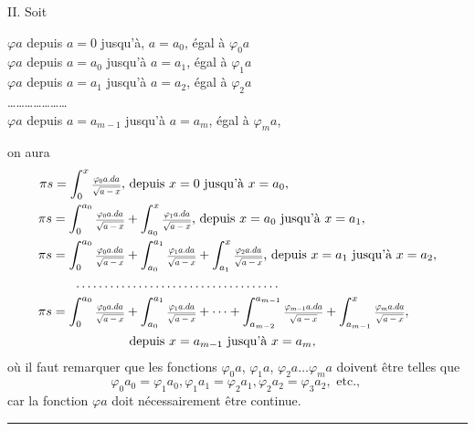 \documentclass[oneside, 12 pt, leqno]{memoir}
\let\oldfrac\frac
\def\frac#1#2{\mathchoice{\text{\scalebox{.83}{${\oldfrac{#1}{#2}}$}}}{\text{\scalebox{.83}{${\displaystyle\oldfrac{#1}{#2}}$}}}{\genfrac{}{}{}{2}{#1}{#2}}{\genfrac{}{}{}{3}{#1}{#2}}}
\begin{document}
II. Soit
\begin{center}
\(\varphi a\) depuis \(a=0\) jusqu'à, \(a=a_0\), égal à \(\varphi_0 a\) \\
\(\varphi a\) depuis \(a=a_0\) jusqu'à \(a=a_1\), égal à \(\varphi_1 a\) \\ 
\(\varphi a\) depuis \(a=a_1\) jusqu'à \(a=a_2\), égal à \(\varphi_2 a\) \\
\dots \dots \dots \dots \dots \dots \dots \\
\(\varphi a\) depuis \(a=a_{m-1}\) jusqu'à \(a=a_m\), égal à \(\varphi_m a\), \\
\end{center}
on aura
\[\begin{aligned}
\pi s  =\int_0^x \frac{\varphi_0 a. d a}{\sqrt{a-x}},& \text { depuis } x=0 \text { jusqu'à } x=a_0, \\
\pi s =\int_0^{a_0} \frac{\varphi_0 a. d a}{\sqrt{a-x}}&+\int_{a_0}^x \frac{\varphi_1 a. d a}{\sqrt{a-x}} \text {, depuis } x=a_0 \text { jusqu'à } x=a_1, \\
\pi s =\int_0^{a_0} \frac{\varphi_0 a. d a}{\sqrt{a-x}}&+\int_{a_0}^{a_1} \frac{\varphi_1 a. d a}{\sqrt{a-x}}+\int_{a_1}^x \frac{\varphi_2 a. d a}{\sqrt{a-x}} \text {, depuis } x=a_1 \text { jusqu'à } x=a_2, \\
 \dots \dots \dots & \dots \dots \dots \dots \dots \dots \dots \dots \dots \\
\pi s = \int_0^{a_0} \frac{\varphi_0 a. d a}{\sqrt{a-x}}&+\int_{a_0}^{a_1} \frac{\varphi_1 a. d a}{\sqrt{a-x}} + \dots + \int_{a_{m-2}}^{a_{m-1}} \frac{\varphi_{m-1} a. d a}{\sqrt{a-x}}+\int_{a_{m-1}}^x \frac{\varphi_m a. d a}{\sqrt{a-x}},\\
&\text{ depuis } x=a_{m-1} \text{ jusqu'à } x=a_m,
\end{aligned}\]
où il faut remarquer que les fonctions \(\varphi_0 a\), \(\varphi_1 a\), \(\varphi_2 a \dots \varphi_m a\) doivent être telles que
\[\varphi_0 a_0=\varphi_1 a_0, \varphi_1 a_1=\varphi_2 a_1, \varphi_2 a_2=\varphi_3 a_2, \text { etc., }\]
car la fonction \(\varphi a\) doit nécessairement être continue.
\begin{center}\rule{2in}{0.1pt}\end{center}
\vfill
\end{document}
